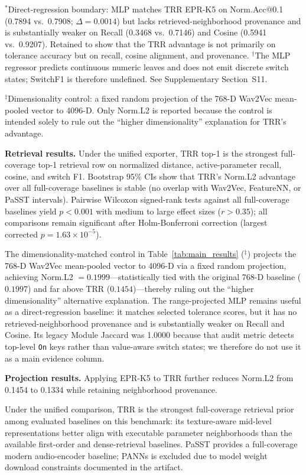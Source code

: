 $^*$Direct-regression boundary: MLP matches TRR EPR-K5 on Norm.Acc@0.1 (0.7894 vs.\ 0.7908; $\Delta=0.0014$) but lacks retrieved-neighborhood provenance and is substantially weaker on Recall (0.3468 vs.\ 0.7146) and Cosine (0.5941 vs.\ 0.9207). Retained to show that the TRR advantage is not primarily on tolerance accuracy but on recall, cosine alignment, and provenance.
$^{\dagger}$The MLP regressor predicts continuous numeric leaves and does not emit discrete switch states; SwitchF1 is therefore undefined. See Supplementary Section~S11.

$^\ddagger$Dimensionality control: a fixed random projection of the 768-D Wav2Vec mean-pooled vector to 4096-D. Only Norm.L2 is reported because the control is intended solely to rule out the ``higher dimensionality'' explanation for TRR's advantage.

\textbf{Retrieval results.} Under the unified exporter, TRR top-1 is the strongest full-coverage top-1 retrieval row on normalized distance, active-parameter recall, cosine, and switch F1. Bootstrap 95\% CIs show that TRR's Norm.L2 advantage over all full-coverage baselines is stable (no overlap with Wav2Vec, FeatureNN, or PaSST intervals). Pairwise Wilcoxon signed-rank tests against all full-coverage baselines yield $p < 0.001$ with medium to large effect sizes ($r > 0.35$); all comparisons remain significant after Holm-Bonferroni correction (largest corrected $p = 1.63 \times 10^{-5}$).

The dimensionality-matched control in Table~\ref{tab:main_results} ($^\ddagger$) projects the 768-D Wav2Vec mean-pooled vector to 4096-D via a fixed random projection, achieving Norm.L2 $=0.1999$---statistically tied with the original 768-D baseline ($0.1997$) and far above TRR ($0.1454$)---thereby ruling out the ``higher dimensionality'' alternative explanation. The range-projected MLP remains useful as a direct-regression baseline: it matches selected tolerance scores, but it has no retrieved-neighborhood provenance and is substantially weaker on Recall and Cosine. Its legacy Module Jaccard was 1.0000 because that audit metric detects top-level \texttt{On} keys rather than value-aware switch states; we therefore do not use it as a main evidence column.

\textbf{Projection results.} Applying EPR-K5 to TRR further reduces Norm.L2 from 0.1454 to 0.1334 while retaining neighborhood provenance.

Under the unified comparison, TRR is the strongest full-coverage retrieval prior among evaluated baselines on this benchmark: its texture-aware mid-level representations better align with executable parameter neighborhoods than the available first-order and dense-retrieval baselines. PaSST provides a full-coverage modern audio-encoder baseline; PANNs is excluded due to model weight download constraints documented in the artifact.


